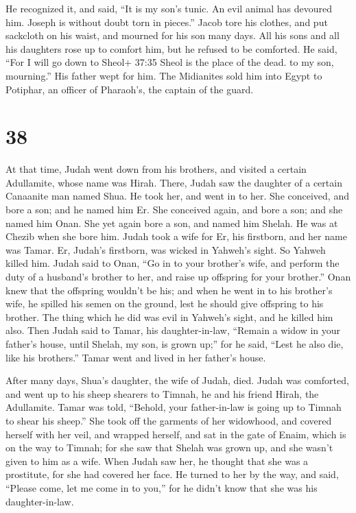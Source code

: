  He recognized it, and said, ``It is my son's tunic. An
evil animal has devoured him. Joseph is without doubt torn in pieces.''
 Jacob tore his clothes, and put sackcloth on his waist,
and mourned for his son many days.  All his sons and all
his daughters rose up to comfort him, but he refused to be comforted. He
said, ``For I will go down to Sheol+ 37:35 Sheol is the place of the
dead. to my son, mourning.'' His father wept for him.  The
Midianites sold him into Egypt to Potiphar, an officer of Pharaoh's, the
captain of the guard.

\hypertarget{section-37}{%
\section{38}\label{section-37}}

 At that time, Judah went down from his brothers, and
visited a certain Adullamite, whose name was Hirah.  There,
Judah saw the daughter of a certain Canaanite man named Shua. He took
her, and went in to her.  She conceived, and bore a son; and
he named him Er.  She conceived again, and bore a son; and
she named him Onan.  She yet again bore a son, and named him
Shelah. He was at Chezib when she bore him.  Judah took a
wife for Er, his firstborn, and her name was Tamar.  Er,
Judah's firstborn, was wicked in Yahweh's sight. So Yahweh killed him.
 Judah said to Onan, ``Go in to your brother's wife, and
perform the duty of a husband's brother to her, and raise up offspring
for your brother.''  Onan knew that the offspring wouldn't
be his; and when he went in to his brother's wife, he spilled his semen
on the ground, lest he should give offspring to his brother.
 The thing which he did was evil in Yahweh's sight, and he
killed him also.  Then Judah said to Tamar, his
daughter-in-law, ``Remain a widow in your father's house, until Shelah,
my son, is grown up;'' for he said, ``Lest he also die, like his
brothers.'' Tamar went and lived in her father's house.

 After many days, Shua's daughter, the wife of Judah, died.
Judah was comforted, and went up to his sheep shearers to Timnah, he and
his friend Hirah, the Adullamite.  Tamar was told,
``Behold, your father-in-law is going up to Timnah to shear his sheep.''
 She took off the garments of her widowhood, and covered
herself with her veil, and wrapped herself, and sat in the gate of
Enaim, which is on the way to Timnah; for she saw that Shelah was grown
up, and she wasn't given to him as a wife.  When Judah saw
her, he thought that she was a prostitute, for she had covered her face.
 He turned to her by the way, and said, ``Please come, let
me come in to you,'' for he didn't know that she was his
daughter-in-law.

